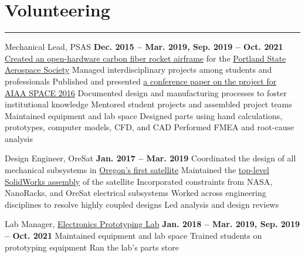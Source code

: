 \vfill
\section{Volunteering}
\noindent\rule{\textwidth}{\hlinewidth}
	\begin{innerlist}
	\item Mechanical Lead, PSAS
		\hfill\textbf{Dec. 2015 -- Mar. 2019, Sep. 2019 -- Oct. 2021} 
		\subitem \href{https://github.com/psas/sw-cad-airframe-lv3.0}{Created 
			an open-hardware carbon fiber rocket airframe} for the 
			\href{http://psas.pdx.edu/}{Portland State Aerospace Society}
		\subitem Managed interdisciplinary projects among students and professionals
		\subitem Published and presented 
            \href{http://arc.aiaa.org/doi/pdf/10.2514/6.2016-5365}{a conference paper on the project for AIAA SPACE 2016}
		\subitem Documented design and manufacturing processes to foster institutional knowledge
		\subitem Mentored student projects and assembled project teams
		\subitem Maintained equipment and lab space
		\subitem Designed parts using hand calculations, prototypes, computer models, CFD, and CAD
		\subitem Performed FMEA and root-cause analysis
	\item Design Engineer, OreSat 
		\hfill\textbf{Jan. 2017 -- Mar. 2019}
		\subitem Coordinated the design of all mechanical subsystems in \href{http://oresat.org/}{Oregon's first satellite}
		\subitem Maintained the \href{https://github.com/oresat/oresat-structure}{top-level SolidWorks assembly} of the satellite
		\subitem Incorporated constraints from NASA, NanoRacks, and OreSat electrical subsystems
		\subitem Worked across engineering disciplines to resolve highly coupled designs
		\subitem Led analysis and design reviews 
    \item Lab Manager, \href{https://psu-epl.github.io/}{Electronics Prototyping Lab}
		\hfill\textbf{Jan. 2018 -- Mar. 2019, Sep. 2019 -- Oct. 2021}
		\subitem Maintained equipment and lab space
		\subitem Trained students on prototyping equipment
		\subitem Ran the lab's parts store
	\end{innerlist}

\vfill
